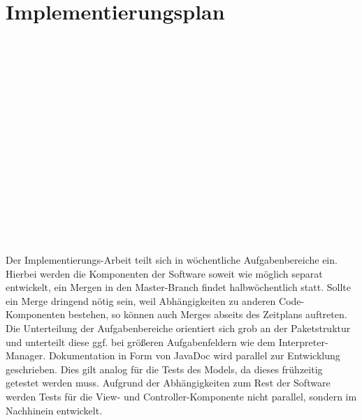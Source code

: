 \documentclass[parskip=full,11pt,twoside]{scrartcl}
\begin{document}
\section{Implementierungsplan}
\begin{ganttchart}[x unit = 1.4cm, y unit chart = 0.95cm]{0}{4}
	\\
	\\
	\\
	\\
	\\
	\\

	\\
	\\
	\\
	\\
	\\
	\\

	\\
	\\

	\\
\end{ganttchart}
\newpage
Der Implementierungs-Arbeit teilt sich in wöchentliche Aufgabenbereiche ein. Hierbei werden die Komponenten der Software soweit wie möglich separat entwickelt, ein Mergen in den Master-Branch findet halbwöchentlich statt. Sollte ein Merge dringend nötig sein, weil Abhängigkeiten zu anderen Code-Komponenten bestehen, so können auch Merges abseits des Zeitplans auftreten. Die Unterteilung der Aufgabenbereiche orientiert sich grob an der Paketstruktur und unterteilt diese ggf. bei größeren Aufgabenfeldern wie dem Interpreter-Manager. Dokumentation in Form von JavaDoc wird parallel zur Entwicklung geschrieben. Dies gilt analog für die Tests des Models, da dieses frühzeitig getestet werden muss. Aufgrund der Abhängigkeiten zum Rest der Software werden Tests für die View- und Controller-Komponente nicht parallel, sondern im Nachhinein entwickelt.
\end{document}
